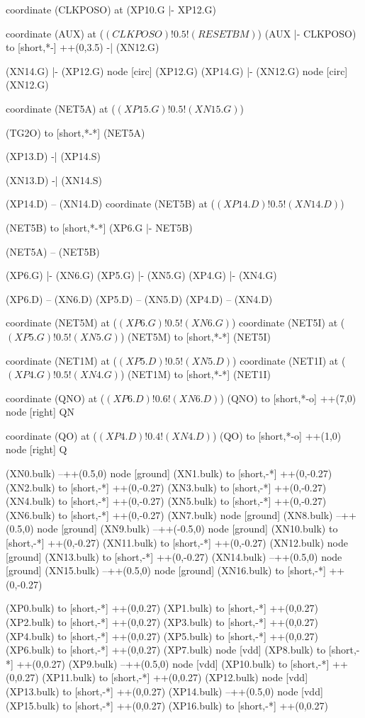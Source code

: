 \begin{circuitikz}[american]
	coordinate (CLKPOSO) at (XP10.G |- XP12.G)	
	
	coordinate (AUX) at ($(CLKPOSO)!0.5!(RESETBM)$)
	(AUX |- CLKPOSO) to [short,*-] ++(0,3.5) -| (XN12.G)
	
	(XN14.G) |- (XP12.G)
	node [circ] (XP12.G) {}
	(XP14.G) |- (XN12.G)
	node [circ] (XN12.G) {}
	
	coordinate (NET5A) at ($(XP15.G)!0.5!(XN15.G)$)
	
	(TG2O) to [short,*-*] (NET5A)
	
	(XP13.D) -| (XP14.S)
	
	(XN13.D) -| (XN14.S)
	
	(XP14.D) -- (XN14.D)
	coordinate (NET5B) at ($(XP14.D)!0.5!(XN14.D)$) 
	
	(NET5B) to [short,*-*] (XP6.G |- NET5B)
	
	(NET5A) -- (NET5B)
	
	(XP6.G) |- (XN6.G)
	(XP5.G) |- (XN5.G) 
	(XP4.G) |- (XN4.G)
	
	(XP6.D) -- (XN6.D)
	(XP5.D) -- (XN5.D)
	(XP4.D) -- (XN4.D) 
	
	coordinate (NET5M) at ($(XP6.G)!0.5!(XN6.G)$)
	coordinate (NET5I) at ($(XP5.G)!0.5!(XN5.G)$)
	(NET5M) to [short,*-*] (NET5I)
	
	coordinate (NET1M) at ($(XP5.D)!0.5!(XN5.D)$) 	
	coordinate (NET1I) at ($(XP4.G)!0.5!(XN4.G)$) 	
	(NET1M) to [short,*-*] (NET1I)
	
	coordinate (QNO) at ($(XP6.D)!0.6!(XN6.D)$)
	(QNO) to [short,*-o] ++(7,0) node [right] {QN}
	
	coordinate (QO) at ($(XP4.D)!0.4!(XN4.D)$)
	(QO) to [short,*-o] ++(1,0) node [right] {Q}
	
	(XN0.bulk) --++(0.5,0) node [ground] {}
	(XN1.bulk) to [short,-*] ++(0,-0.27)		
	(XN2.bulk) to [short,-*] ++(0,-0.27)
	(XN3.bulk) to [short,-*] ++(0,-0.27)
	(XN4.bulk) to [short,-*] ++(0,-0.27)
	(XN5.bulk) to [short,-*] ++(0,-0.27)
	(XN6.bulk) to [short,-*] ++(0,-0.27)
	(XN7.bulk) node [ground] {}
	(XN8.bulk) --++(0.5,0) node [ground] {}
	(XN9.bulk) --++(-0.5,0) node [ground] {}
	(XN10.bulk) to [short,-*] ++(0,-0.27)
	(XN11.bulk) to [short,-*] ++(0,-0.27)
	(XN12.bulk) node [ground] {}
	(XN13.bulk) to [short,-*] ++(0,-0.27)
	(XN14.bulk) --++(0.5,0) node [ground] {}
	(XN15.bulk) --++(0.5,0) node [ground] {}
	(XN16.bulk) to [short,-*] ++(0,-0.27)
		
	(XP0.bulk) to [short,-*] ++(0,0.27)
	(XP1.bulk) to [short,-*] ++(0,0.27)	
	(XP2.bulk) to [short,-*] ++(0,0.27)
	(XP3.bulk) to [short,-*] ++(0,0.27)	
	(XP4.bulk) to [short,-*] ++(0,0.27)
	(XP5.bulk) to [short,-*] ++(0,0.27)
	(XP6.bulk) to [short,-*] ++(0,0.27)	
	(XP7.bulk) node [vdd] {}	
	(XP8.bulk) to [short,-*] ++(0,0.27)
	(XP9.bulk) --++(0.5,0) node [vdd] {}
	(XP10.bulk) to [short,-*] ++(0,0.27)
	(XP11.bulk) to [short,-*] ++(0,0.27)
	(XP12.bulk) node [vdd] {}
	(XP13.bulk) to [short,-*] ++(0,0.27)
	(XP14.bulk) --++(0.5,0) node [vdd] {}
	(XP15.bulk) to [short,-*] ++(0,0.27)
	(XP16.bulk) to [short,-*] ++(0,0.27)		


\end{circuitikz}
